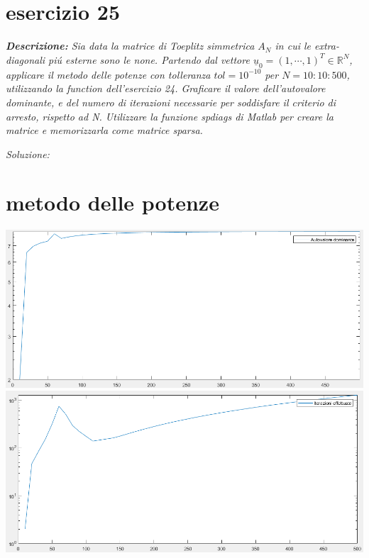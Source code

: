 \section{esercizio 25}

\textit{\textbf{Descrizione:}  Sia data la matrice di Toeplitz simmetrica $A_{N}$ in cui le extra-diagonali pi\'u esterne sono le none. Partendo dal vettore $\underline{u}_{0} = (1, \cdots,1)^{T} \in \mathbb{R}^{N}$, applicare il metodo delle potenze con tolleranza $tol=10^{-10}$ per $N=10:10:500$, utilizzando la function dell'esercizio 24. Graficare il valore dell'autovalore dominante, e del numero di iterazioni necessarie per soddisfare il criterio di arresto, rispetto ad N. Utilizzare la funzione spdiags di Matlab per creare la matrice e memorizzarla come matrice sparsa.}

\noindent\emph{Soluzione: }\newline
\section*{metodo delle potenze}
\newpage

\includegraphics[width=1\linewidth]{img/autovalore.png}
\includegraphics[width=1\linewidth]{img/iterazioniPotenze.png}
